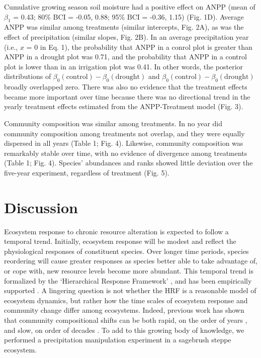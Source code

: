 \documentclass[fleqn,10pt]{wlpeerj} %
\begin{document}
Cumulative growing season soil moisture had a positive effect on ANPP
(mean of \(\beta_{1}\) = 0.43; 80\% BCI = -0.05, 0.88; 95\% BCI = -0.36,
1.15) (Fig. 1D). Average ANPP was similar among treatments (similar
intercepts, Fig. 2A), as was the effect of precipitation (similar
slopes, Fig. 2B). In an average precipitation year (i.e., \(x\) = 0 in
Eq. 1), the probability that ANPP in a conrol plot is greater than ANPP
in a drought plot was 0.71, and the probability that ANPP in a control
plot is lower than in an irrigation plot was 0.41. In other words, the
posterior distributions of
\(\beta_0(\text{control}) - \beta_0(\text{drought})\) and
\(\beta_0(\text{control}) - \beta_0(\text{drought})\) broadly overlapped
zero. There was also no evidence that the treatment effects became more
important over time because there was no directional trend in the yearly
treatment effects estimated from the ANPP-Treatment model (Fig. 3).

Community composition was similar among treatments. In no year did
community composition among treatments not overlap, and they were
equally dispersed in all years (Table 1; Fig. 4). Likewise, community
composition was remarkably stable over time, with no evidence of
divergence among treatments (Table 1; Fig. 4). Species' abundances and
ranks showed little deviation over the five-year experiment, regardless
of treatment (Fig. 5).

\section{Discussion}\label{discussion}

Ecosystem response to chronic resource alteration is expected to follow
a temporal trend. Initially, ecosystem response will be modest and
reflect the physiological responses of constituent species. Over longer
time periods, species reordering will cause greater responses as species
better able to take advantage of, or cope with, new resource levels
become more abundant. This temporal trend is formalized by the
`Hierarchical Response Framework' \citep[HRF,][]{Smith2009}, and has
been empirically supported \citep{Knapp2012, Wilcox2016}. A lingering
question is not whether the HRF is a reasonable model of ecosystem
dynamics, but rather how the time scales of ecosystem response and
community change differ among ecosystems. Indeed, previous work has
shown that community compositional shifts can be both rapid, on the
order of years \citep{Hoover2014}, and slow, on order of decades
\citep{Knapp2012, Wilcox2016}. To add to this growing body of knowledge,
we performed a precipitation manipulation experiment in a sagebrush
steppe ecosystem.
\end{document}
